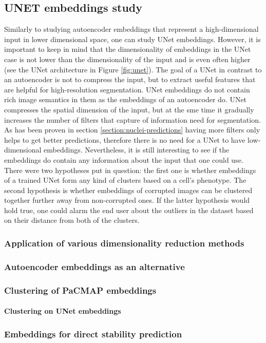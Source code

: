 \subsection{UNET embeddings study}
    \label{section:unet-embeddings-study}
    Similarly to studying autoencoder embeddings that represent a high-dimensional input in lower dimensional space, one can study UNet embeddings. However, it is important to keep in mind that the dimensionality of embeddings in the UNet case is not lower than the dimensionality of the input and is even often higher (see the UNet architecture in Figure \ref{fig:unet}). The goal of a UNet in contrast to an autoencoder is not to compress the input, but to extract useful features that are helpful for high-resolution segmentation. UNet embeddings do not contain rich image semantics in them as the embeddings of an autoencoder do. UNet compresses the spatial dimension of the input, but at the sme time it gradually increases the number of filters that capture of information need for segmentation. As has been proven in section \ref{section:nuclei-predictions} having more filters only helps to get better predictions, therefore there is no need for a UNet to have low-dimensional embeddings. Nevertheless, it is still interesting to see if the embeddings do contain any information about the input that one could use. There were two hypotheses put in question: the first one is whether embeddings of a trained UNet form any kind of clusters based on a cell's phenotype. The second hypothesis is whether embeddings of corrupted images can be clustered together further away from non-corrupted ones. If the latter hypothesis would hold true, one could alarm the end user about the outliers in the dataset based on their distance from both of the clusters. 
    \subsubsection{Application of various dimensionality reduction methods}
        \label{section:unet-embeddings-dim-reduction}
        
    \subsubsection{Autoencoder embeddings as an alternative}
        
    \subsubsection{Clustering of PaCMAP embeddings}
        \label{section:pacmap-embeddings-clustering}
        \paragraph{Clustering on UNet embeddings}
        \label{section:clustering-on-unet-embeddings}
        
    \subsubsection{Embeddings for direct stability prediction}
        